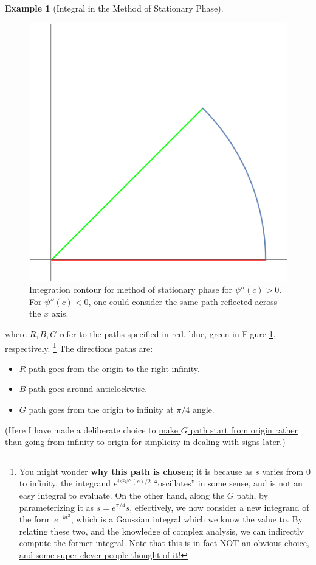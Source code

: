 \documentclass[a4paper, 12pt]{article}
\theoremstyle{definition}
\newtheorem{example}{Example}
\numberwithin{theorem}{section}
\numberwithin{definition}{section}
\numberwithin{exercise}{section}
\numberwithin{remark}{section}
\numberwithin{figure}{section}
\numberwithin{example}{section}
\begin{document}
\begin{example}[Integral in the Method of Stationary Phase]
\begin{figure}[tbp]
        \includegraphics[scale=0.5]{MethodOfStationaryPhase}
        \caption{Integration contour for method of stationary phase for $\psi''(c)>0$. For $\psi''(c)<0$, one could consider the same path reflected across the $x$ axis.}
        \label{fig: Method of Stationary Phase}
    \end{figure}
    where $R, B, G$ refer to the paths specified in red, blue, green in Figure \ref{fig: Method of Stationary Phase}, respectively.
    \footnote{You might wonder \textbf{why this path is chosen};
    it is because as $s$ varies from 0 to infinity,
    the integrand $e^{is^2 \psi''(c)/2}$ ``oscillates'' in some sense,
    and is not an easy integral to evaluate.
    On the other hand, along the $G$ path, by parameterizing it as $s = e^{\pi/4} s$,
    effectively, we now consider a new integrand of the form $e^{-k t^2}$,
    which is a Gaussian integral which we know the value to.
    By relating these two, and the knowledge of complex analysis,
    we can indirectly compute the former integral.
    \ul{Note that this is in fact NOT an obvious choice, and some super clever people thought of it!}
}
    The directions paths are:
    \begin{itemize}
        \item $R$ path goes from the origin to the right infinity.
        \item $B$ path goes around anticlockwise.
        \item $G$ path goes from the origin to infinity at $\pi/4$ angle.
    \end{itemize}
    (Here I have made a deliberate choice to \ul{make $G$ path start from origin rather than going from infinity to origin} for simplicity in dealing with signs later.)
    

\end{example}
\end{document}
